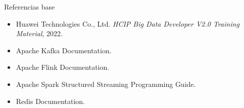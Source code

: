 \documentclass[aspectratio=169]{beamer}
\begin{document}
\begin{frame}{Referencias base}
  \small
  \begin{itemize}
    \item Huawei Technologies Co., Ltd. \textit{HCIP Big Data Developer V2.0 Training Material}, 2022.
    \item Apache Kafka Documentation.
    \item Apache Flink Documentation.
    \item Apache Spark Structured Streaming Programming Guide.
    \item Redis Documentation.
  \end{itemize}
\end{frame}
\end{document}
